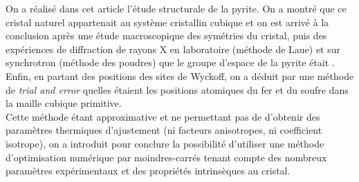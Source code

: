 On a réalisé dans cet article l'étude structurale de la pyrite.
On a montré que ce cristal naturel appartenait au système cristallin cubique et on est arrivé à la conclusion après une étude macroscopique des symétries du cristal, puis des expériences de diffraction de rayons X en laboratoire (méthode de Laue) et sur synchrotron (méthode des poudres) que le groupe d'espace de la pyrite était .\\
Enfin, en partant des positions des sites de Wyckoff, on a déduit par une méthode de \textit{trial and error} quelles étaient les positions atomiques du fer et du soufre dans la maille cubique primitive.\\
Cette méthode étant approximative et ne permettant pas de d'obtenir des paramètres thermiques d'ajustement (ni facteurs anisotropes, ni coefficient isotrope), on a introduit pour conclure la possibilité d'utiliser une méthode d'optimisation numérique par moindres-carrés tenant compte des nombreux paramètres expérimentaux et des propriétés intrinsèques au cristal.
\\



